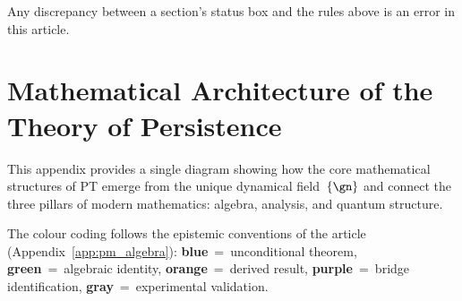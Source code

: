 \documentclass[12pt,a4paper]{article}
\begin{document}
Any discrepancy between a section's status box and the rules
above is an error in this article.


\newpage


\section{Mathematical Architecture of the Theory of Persistence}
\label{app:architecture}

This appendix provides a single diagram showing how the core
mathematical structures of PT emerge from the unique dynamical
field~$\{\gn\}$ and connect the three pillars of modern
mathematics: algebra, analysis, and quantum structure.

The colour coding follows the epistemic conventions of the
article (Appendix~\ref{app:pm_algebra}):
\textcolor{thmblue}{\textbf{blue}}~=~unconditional theorem,
\textcolor{idgreen}{\textbf{green}}~=~algebraic identity,
\textcolor{derorange}{\textbf{orange}}~=~derived result,
\textcolor{bridgepurple}{\textbf{purple}}~=~bridge identification,
\textcolor{valgray}{\textbf{gray}}~=~experimental validation.
\end{document}
